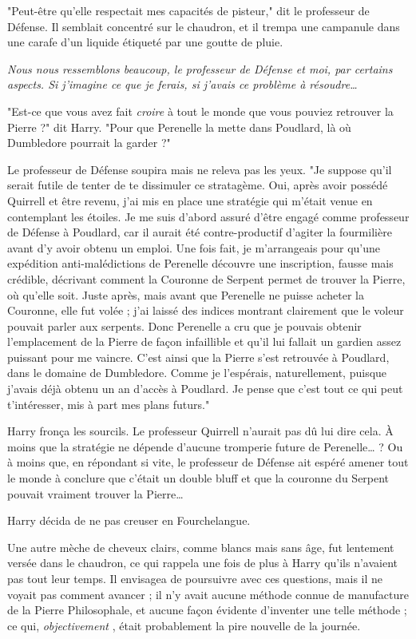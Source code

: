 "Peut-être qu'elle respectait mes capacités de pisteur," dit le professeur de Défense. Il semblait concentré sur le chaudron, et il trempa une campanule dans une carafe d'un liquide étiqueté par une goutte de pluie.

\emph{Nous nous ressemblons beaucoup, le professeur de Défense et moi, par certains aspects. Si j'imagine ce que je ferais, si j'avais ce problème à résoudre…} 

"Est-ce que vous avez fait \emph{croire}  à tout le monde que vous pouviez retrouver la Pierre ?" dit Harry. "Pour que Perenelle la mette dans Poudlard, là où Dumbledore pourrait la garder ?"

Le professeur de Défense soupira mais ne releva pas les yeux. "Je suppose qu'il serait futile de tenter de te dissimuler ce stratagème. Oui, après avoir possédé Quirrell et être revenu, j'ai mis en place une stratégie qui m'était venue en contemplant les étoiles. Je me suis d'abord assuré d'être engagé comme professeur de Défense à Poudlard, car il aurait été contre-productif d'agiter la fourmilière avant d'y avoir obtenu un emploi. Une fois fait, je m'arrangeais pour qu'une expédition anti-malédictions de Perenelle découvre une inscription, fausse mais crédible, décrivant comment la Couronne de Serpent permet de trouver la Pierre, où qu'elle soit. Juste après, mais avant que Perenelle ne puisse acheter la Couronne, elle fut volée ; j'ai laissé des indices montrant clairement que le voleur pouvait parler aux serpents. Donc Perenelle a cru que je pouvais obtenir l'emplacement de la Pierre de façon infaillible et qu'il lui fallait un gardien assez puissant pour me vaincre. C'est ainsi que la Pierre s'est retrouvée à Poudlard, dans le domaine de Dumbledore. Comme je l'espérais, naturellement, puisque j'avais déjà obtenu un an d'accès à Poudlard. Je pense que c'est tout ce qui peut t'intéresser, mis à part mes plans futurs."

Harry fronça les sourcils. Le professeur Quirrell n'aurait pas dû lui dire cela. À moins que la stratégie ne dépende d'aucune tromperie future de Perenelle… ? Ou à moins que, en répondant si vite, le professeur de Défense ait espéré amener tout le monde à conclure que c'était un double bluff et que la couronne du Serpent pouvait vraiment trouver la Pierre…

Harry décida de ne pas creuser en Fourchelangue.

Une autre mèche de cheveux clairs, comme blancs mais sans âge, fut lentement versée dans le chaudron, ce qui rappela une fois de plus à Harry qu'ils n'avaient pas tout leur temps. Il envisagea de poursuivre avec ces questions, mais il ne voyait pas comment avancer ; il n'y avait aucune méthode connue de manufacture de la Pierre Philosophale, et aucune façon évidente d'inventer une telle méthode ; ce qui, \emph{objectivement} , était probablement la pire nouvelle de la journée.


